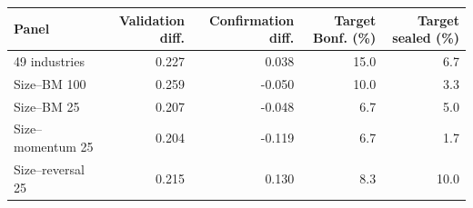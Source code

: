 \begin{tabular}{lrrrr}
\toprule
Panel & Validation diff. & Confirmation diff. & Target Bonf. (\%) & Target sealed (\%) \\
\midrule
49 industries & 0.227 & 0.038 & 15.0 & 6.7 \\
Size--BM 100 & 0.259 & -0.050 & 10.0 & 3.3 \\
Size--BM 25 & 0.207 & -0.048 & 6.7 & 5.0 \\
Size--momentum 25 & 0.204 & -0.119 & 6.7 & 1.7 \\
Size--reversal 25 & 0.215 & 0.130 & 8.3 & 10.0 \\
\bottomrule
\end{tabular}

